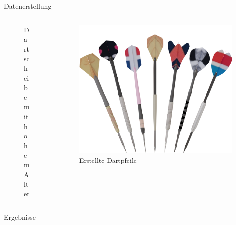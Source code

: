 \begin{frame}{Datenerstellung}
\begin{columns}
\begin{column}{0.33\linewidth}
\begin{figure}
                \caption{Dartscheibe mit hohem Alter}
            \end{figure}
        \end{column}
        \begin{column}{0.33\linewidth}
            \begin{figure}
                \centering
                \includegraphics[width=\textwidth]{imgs/darts_examples.png}
                \caption{Erstellte Dartpfeile}
            \end{figure}
        \end{column}
    \end{columns}
\end{frame}

\begin{frame}{Ergebnisse}
    
\end{frame}
